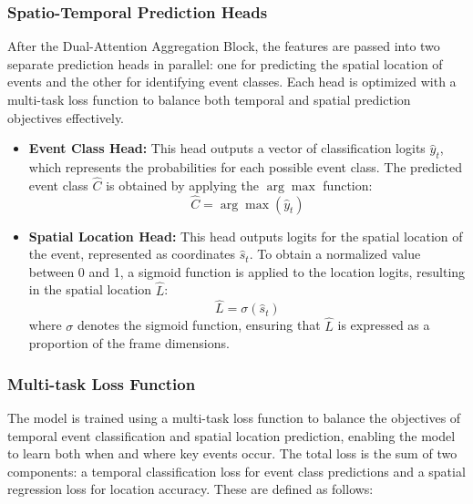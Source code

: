 \documentclass[conference]{IEEEtran}
\begin{document}
\subsubsection{Spatio-Temporal Prediction Heads}

After the Dual-Attention Aggregation Block, the features are passed into two separate prediction heads in parallel: one for predicting the spatial location of events and the other for identifying event classes. Each head is optimized with a multi-task loss function to balance both temporal and spatial prediction objectives effectively.

\begin{itemize}
    \item \textbf{Event Class Head:} This head outputs a vector of classification logits \(\hat{y}_t\), which represents the probabilities for each possible event class. The predicted event class \(\hat{C}\) is obtained by applying the \(\arg\max\) function:
    \[
    \hat{C} = \arg\max(\hat{y}_t)
    \]

    \item \textbf{Spatial Location Head:} This head outputs logits for the spatial location of the event, represented as coordinates \(\hat{s}_t\). To obtain a normalized value between 0 and 1, a sigmoid function is applied to the location logits, resulting in the spatial location \(\hat{L}\):
    \[
    \hat{L} = \sigma(\hat{s}_t)
    \]
    where \(\sigma\) denotes the sigmoid function, ensuring that \(\hat{L}\) is expressed as a proportion of the frame dimensions.
\end{itemize}

\subsubsection{Multi-task Loss Function}

The model is trained using a multi-task loss function to balance the objectives of temporal event classification and spatial location prediction, enabling the model to learn both when and where key events occur. The total loss is the sum of two components: a temporal classification loss for event class predictions and a spatial regression loss for location accuracy. These are defined as follows:
\end{document}
